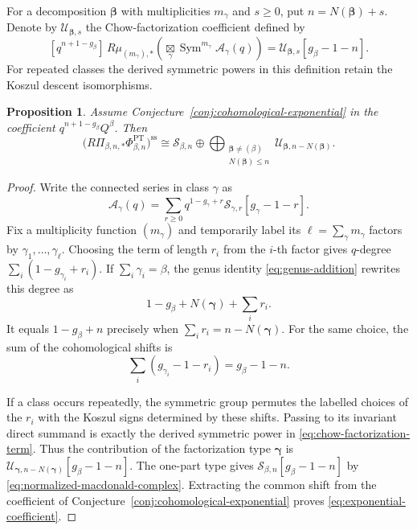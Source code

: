 \documentclass[11pt,reqno]{amsart}
\newtheorem{proposition}[theorem]{Proposition}
\theoremstyle{definition}
\newcommand{\PT}{\operatorname{PT}}
\newcommand{\bigboxtimes}{\mathop{\boxtimes}\limits}
\begin{document}
For a decomposition $\boldsymbol\beta$ with multiplicities $m_\gamma$ and
$s\ge0$, put $n=N(\boldsymbol\beta)+s$.  Denote by
$\mathcal U_{\boldsymbol\beta,s}$ the Chow-factorization coefficient defined
by
\begin{equation}\label{eq:chow-factorization-term}
 [q^{n+1-g_\beta}]\,
 R\mu_{(m_\gamma),*}
 \left(\bigboxtimes_\gamma
 \operatorname{Sym}^{m_\gamma}\mathcal A_\gamma(q)\right)
 =\mathcal U_{\boldsymbol\beta,s}[g_\beta-1-n].
\end{equation}
For repeated classes the derived symmetric powers in this definition retain
the Koszul descent isomorphisms.

\begin{proposition}\label{prop:exponential-coefficient}
Assume Conjecture~\ref{conj:cohomological-exponential} in the coefficient
$q^{n+1-g_\beta}Q^\beta$.  Then
\begin{equation}\label{eq:exponential-coefficient}
 \bigl(R\Pi_{\beta,n,*}\Phi_{\beta,n}^{\PT}\bigr)^{\mathrm{ss}}
 \cong \mathcal S_{\beta,n}\oplus
 \bigoplus_{\substack{\boldsymbol\beta\ne(\beta)\\
                       N(\boldsymbol\beta)\le n}}
 \mathcal U_{\boldsymbol\beta,n-N(\boldsymbol\beta)}.
\end{equation}
\end{proposition}

\begin{proof}
Write the connected series in class $\gamma$ as
\[
 \mathcal A_\gamma(q)
 =\sum_{r\ge0}q^{1-g_\gamma+r}
  \mathcal S_{\gamma,r}[g_\gamma-1-r].
\]
Fix a multiplicity function $(m_\gamma)$ and temporarily label its
$\ell=\sum_\gamma m_\gamma$ factors by
$\gamma_1,\ldots,\gamma_\ell$.  Choosing the term of length $r_i$ from the
$i$-th factor gives $q$-degree
$\sum_i(1-g_{\gamma_i}+r_i)$.  If
$\sum_i\gamma_i=\beta$, the genus identity
\eqref{eq:genus-addition} rewrites this degree as
\[
 1-g_\beta+N(\boldsymbol\gamma)+\sum_i r_i.
\]
It equals $1-g_\beta+n$ precisely when
$\sum_i r_i=n-N(\boldsymbol\gamma)$.  For the same choice, the sum of the
cohomological shifts is
\[
 \sum_i(g_{\gamma_i}-1-r_i)=g_\beta-1-n.
\]

If a class occurs repeatedly, the symmetric group permutes the labelled
choices of the $r_i$ with the Koszul signs determined by these shifts.
Passing to its invariant direct summand is exactly the derived symmetric
power in \eqref{eq:chow-factorization-term}.  Thus the contribution of the
factorization type $\boldsymbol\gamma$ is
$\mathcal U_{\boldsymbol\gamma,n-N(\boldsymbol\gamma)}[g_\beta-1-n]$.
The one-part type gives
$\mathcal S_{\beta,n}[g_\beta-1-n]$ by
\eqref{eq:normalized-macdonald-complex}.  Extracting the common shift from
the coefficient of Conjecture~\ref{conj:cohomological-exponential} proves
\eqref{eq:exponential-coefficient}.
\end{proof}
\end{document}
